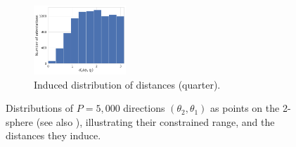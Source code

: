 \begin{figure}[ht!]
\begin{subfigure}[b]{0.22\linewidth}
        \includegraphics[height=7em]{figures/dQ_5a1a_quarter.pdf}
        \caption{Induced distribution of distances (quarter).}
    \end{subfigure}
    \caption{%
        Distributions of $P=5,000$ directions $(\theta_2, \theta_1)$ as points on the 2-sphere (see also ), illustrating their constrained range, and the distances they induce.
        }\label{fig:orientation-constraints}
\end{figure}


